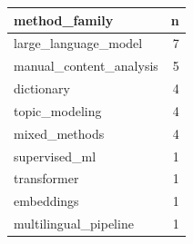 \begin{tabular}{lr}
\toprule
method\_family & n \\
\midrule
large\_language\_model & 7 \\
manual\_content\_analysis & 5 \\
dictionary & 4 \\
topic\_modeling & 4 \\
mixed\_methods & 4 \\
supervised\_ml & 1 \\
transformer & 1 \\
embeddings & 1 \\
multilingual\_pipeline & 1 \\
\bottomrule
\end{tabular}
